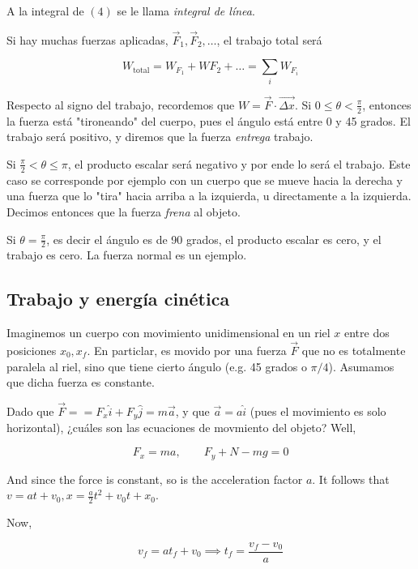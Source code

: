 \documentclass[12pt]{article}
\theoremstyle{definition}
\begin{document}
A la integral de $(4)$ se le llama \textit{integral de línea}.

Si hay muchas fuerzas aplicadas, $\vec{F}_1, \vec{F}_2, \ldots$, el trabajo
total será 

\begin{equation*}
    W_{\text{total}}= W_{F_1} + W F_2 + \ldots = \sum_{i} W_{F_i}
\end{equation*}

Respecto al signo del trabajo, recordemos que $W = \vec{F} \cdot \vec{\Delta
x}$. Si $ 0 \leq \theta < \frac{\pi}{2}$, entonces la fuerza está "tironeando"
del cuerpo, pues el ángulo está entre 0 y 45 grados. El trabajo será positivo, y
diremos que la fuerza \textit{entrega} trabajo.

Si $\frac{\pi}{2} < \theta \leq \pi$, el producto escalar será negativo y por
ende lo será el trabajo. Este caso se corresponde por ejemplo con un cuerpo que
se mueve hacia la derecha y una fuerza que lo "tira" hacia arriba a la
izquierda, u directamente a la izquierda. Decimos entonces que la fuerza \textit{frena} al objeto.

Si $\theta = \frac{\pi}{2}$, es decir el ángulo es de 90 grados, el producto
escalar es cero, y el trabajo es cero. La fuerza normal es un ejemplo.

\subsection{Trabajo y energía cinética}

Imaginemos un cuerpo con movimiento unidimensional en un riel $x$ entre dos
posiciones $x_0, x_f$. En particlar, es movido por una fuerza $\vec{F}$ que no
es totalmente paralela al riel, sino que tiene cierto ángulo (e.g. 45 grados o
$\pi / 4$). Asumamos que dicha fuerza es constante.

Dado que $\vec{F} = = F_x \hat{i} + F_y \hat{j} = m \vec{a}$, y que $\vec{a} = a
\hat{i}$ (pues el movimiento es solo horizontal), ¿cuáles son las ecuaciones de
movmiento del objeto? Well, 

\begin{equation*}
    F_x = m a, \qquad F_y + N - mg = 0
\end{equation*}

And since the force is constant, so is the acceleration factor $a$. It follows
that $v = at + v_0, x = \frac{a}{2}t^2 + v_0 t + x_0$. 

Now, 

\begin{equation*}
    v_f = at_f + v_0 \implies t_f = \frac{v_f - v_0}{a} 
\end{equation*}
\end{document}
